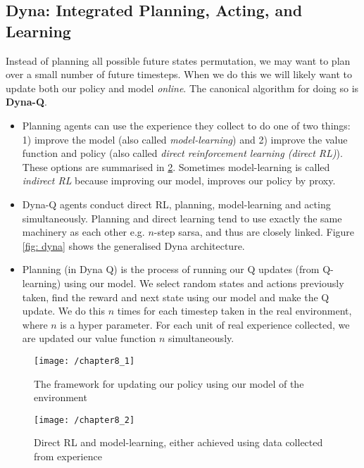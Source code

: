 \subsection{Dyna: Integrated Planning, Acting, and Learning}
Instead of planning all possible future states permutation, we may want to plan over a small number of future timesteps. When we do this we will likely want to update both our policy and model \textit{online}. The canonical algorithm for doing so is \textbf{Dyna-Q}. 
\begin{itemize}
\item Planning agents can use the experience they collect to do one of two things: 1) improve the model (also called \textit{model-learning}) and 2) improve the value function and policy (also called \textit{direct reinforcement learning (direct RL)}). These options are summarised in  \ref{fig: direct rl and model-learning}. Sometimes model-learning is called \textit{indirect RL} because improving our model, improves our policy by proxy.
\item Dyna-Q agents conduct direct RL, planning, model-learning and acting simultaneously. Planning and direct learning tend to use exactly the same machinery as each other e.g. $n$-step sarsa, and thus are closely linked. Figure \ref{fig: dyna} shows the generalised Dyna architecture.
\item Planning (in Dyna Q) is the process of running our Q updates (from Q-learning) using our model. We select random states and actions previously taken, find the reward and next state using our model and make the Q update. We do this $n$ times for each timestep taken in the real environment, where $n$ is a hyper parameter. For each unit of real experience collected, we are updated our value function $n$ simultaneously.
\end{itemize}

\begin{figure}
	\centering
	\texttt{[image: /chapter8\_1]}
	\caption{The framework for updating our policy using our model of the environment}
	\label{fig: updating policy using model}
\end{figure}

\begin{figure}
	\centering
	\texttt{[image: /chapter8\_2]}
	\caption{Direct RL and model-learning, either achieved using data collected from experience}
	\label{fig: direct rl and model-learning}
\end{figure}

